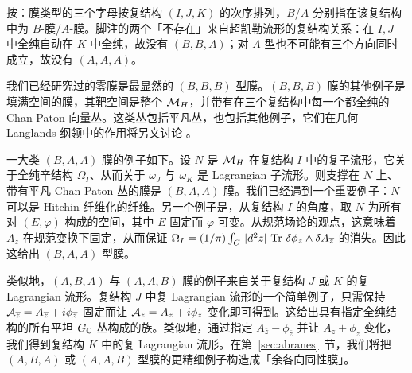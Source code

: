 \begin{yizhu}[易错点]
按：膜类型的三个字母按复结构 $(I,J,K)$ 的次序排列，$B$/$A$ 分别指在该复结构中为 $B$-膜/$A$-膜。脚注的两个「不存在」来自超凯勒流形的复结构关系：在 $I,J$ 中全纯自动在 $K$ 中全纯，故没有 $(B,B,A)$；对 $A$-型也不可能有三个方向同时成立，故没有 $(A,A,A)$。
\end{yizhu}

我们已经研究过的零膜是最显然的 $(B,B,B)$ 型膜。$(B,B,B)$-膜的其他例子是填满空间的膜，其靶空间是整个 $\MH$，并带有在三个复结构中每一个都全纯的 Chan-Paton 向量丛。这类丛包括平凡丛，也包括其他例子，它们在几何 Langlands 纲领中的作用将另文讨论 \cite{ref26}。

一大类 $(B,A,A)$-膜的例子如下。设 $N$ 是 $\MH$ 在复结构 $I$ 中的复子流形，它关于全纯辛结构 $\Omega_I$、从而关于 $\omega_J$ 与 $\omega_K$ 是 Lagrangian 子流形。则支撑在 $N$ 上、带有平凡 Chan-Paton 丛的膜是 $(B,A,A)$-膜。我们已经遇到一个重要例子：$N$ 可以是 Hitchin 纤维化的纤维。另一个例子是，从复结构 $I$ 的角度，取 $N$ 为所有对 $(E,\varphi)$ 构成的空间，其中 $E$ 固定而 $\varphi$ 可变。从规范场论的观点，这意味着 $A_{\bar z}$ 在规范变换下固定，从而保证 $\Omega_I=(1/\pi)\int_C\,|d^2z|\,\Tr\,\delta\phi_z\wedge\delta A_{\bar z}$ 的消失。因此这给出 $(B,A,A)$ 型膜。

类似地，$(A,B,A)$ 与 $(A,A,B)$-膜的例子来自关于复结构 $J$ 或 $K$ 的复 Lagrangian 流形。复结构 $J$ 中复 Lagrangian 流形的一个简单例子，只需保持 ${\cal A}_{\bar z}=A_{\bar z}+ i\phi_{\bar z}$ 固定而让 ${\cal A}_z=A_z+i\phi_z$ 变化即可得到。这给出具有指定全纯结构的所有平坦 $G_{{\Bbb{C}}}$ 丛构成的族。类似地，通过指定 $A_{\bar z}-\phi_{\bar z}$ 并让 $A_z+\phi_z$ 变化，我们得到复结构 $K$ 中的复 Lagrangian 流形。在第~\ref{sec:abranes}~节，我们将把 $(A,B,A)$ 或 $(A,A,B)$ 型膜的更精细例子构造成「余各向同性膜」。
